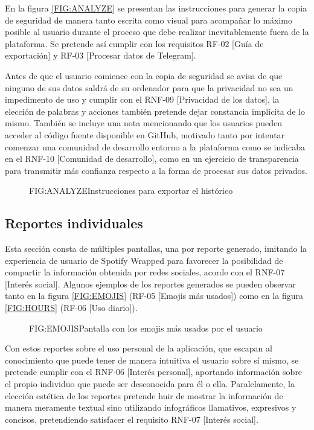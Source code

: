 En la figura \ref{FIG:ANALYZE} se presentan las instrucciones para generar la copia de seguridad de manera tanto escrita como visual para acompañar lo máximo posible al usuario durante el proceso que debe realizar inevitablemente fuera de la plataforma. Se pretende así cumplir con los requisitos RF-02 [Guía de exportación] y RF-03 [Procesar datos de Telegram].

Antes de que el usuario comience con la copia de seguridad se avisa de que ninguno de sus datos saldrá de su ordenador para que la privacidad no sea un impedimento de uso y cumplir con el RNF-09 [Privacidad de los datos], la elección de palabras y acciones también pretende dejar constancia implícita de lo mismo. También se incluye una nota mencionando que los usuarios pueden acceder al código fuente disponible en GitHub, motivado tanto por intentar comenzar una comunidad de desarrollo entorno a la plataforma como se indicaba en el RNF-10 [Comunidad de desarrollo], como en un ejercicio de transparencia para transmitir más confianza respecto a la forma de procesar sus datos privados.

\begin{figure}[Pantalla de instrucciones]{FIG:ANALYZE}{Instrucciones para exportar el histórico}
\end{figure}

\subsection{Reportes individuales}

Esta sección consta de múltiples pantallas, una por reporte generado, imitando la experiencia de usuario de Spotify Wrapped para favorecer la posibilidad de compartir la información obtenida por redes sociales, acorde con el RNF-07 [Interés social]. Algunos ejemplos de los reportes generados se pueden observar tanto en la figura \ref{FIG:EMOJIS} (RF-05 [Emojis más usados]) como en la figura \ref{FIG:HOURS} (RF-06 [Uso diario]).

\begin{figure}[Reporte de emojis más usados]{FIG:EMOJIS}{Pantalla con los emojis más usados por el usuario}
\end{figure}

Con estos reportes sobre el uso personal de la aplicación, que escapan al conocimiento que puede tener de manera intuitiva el usuario sobre sí mismo, se pretende cumplir con el RNF-06 [Interés personal], aportando información sobre el propio individuo que puede ser desconocida para él o ella. Paralelamente, la elección estética de los reportes pretende huir de mostrar la información de manera meramente textual sino utilizando infográficos llamativos, expresivos y concisos, pretendiendo satisfacer el requisito RNF-07 [Interés social].

